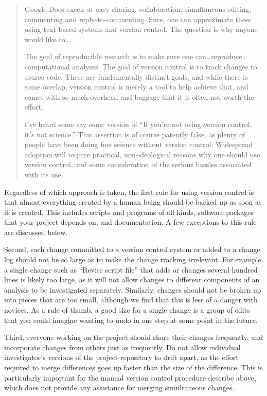 \documentclass[10pt]{article}
\begin{document}
\begin{quote}
Google Docs excels at easy sharing, collaboration, simultaneous
editing, commenting and reply-to-commenting. Sure, one can approximate
these using text-based systems and version control. The question is
why anyone would like to{\ldots}

The goal of reproducible research is to make sure one
can{\dots}reproduce{\ldots}computational analyses. The goal of version
control is to track changes to source code. These are fundamentally
distinct goals, and while there is some overlap, version control is
merely a tool to help achieve that, and comes with so much overhead
and baggage that it is often not worth the effort.

I've heard some say some version of ``If you're not using version
control, it's not science.'' This assertion is of course patently
false, as plenty of people have been doing fine science without
version control. Widespread adoption will require practical,
non-ideological reasons why one should use version control, and some
consideration of the serious hassles associated with its use.
\end{quote}

Regardless of which approach is taken, the first rule for using version
control is that almost everything created by a human being should be
backed up as soon as it is created. This includes scripts and programs
of all kinds, software packages that your project depends on, and
documentation. A few exceptions to this rule are discussed below.

Second, each change committed to a version control system or added to a
change log should not be so large as to make the change tracking
irrelevant. For example, a single change such as ``Revise script file''
that adds or changes several hundred lines is likely too large, as it
will not allow changes to different components of an analysis to be
investigated separately. Similarly, changes should not be broken up into
pieces that are too small, although we find that this is less of a
danger with novices. As a rule of thumb, a good size for a single change
is a group of edits that you could imagine wanting to undo in one step
at some point in the future.

Third, everyone working on the project should share their changes
frequently, and incorporate changes from others just as frequently. Do
not allow individual investigator's versions of the project repository
to drift apart, as the effort required to merge differences goes up
faster than the size of the difference. This is particularly important
for the manual version control procedure describe above, which does not
provide any assistance for merging simultaneous changes.
\end{document}
